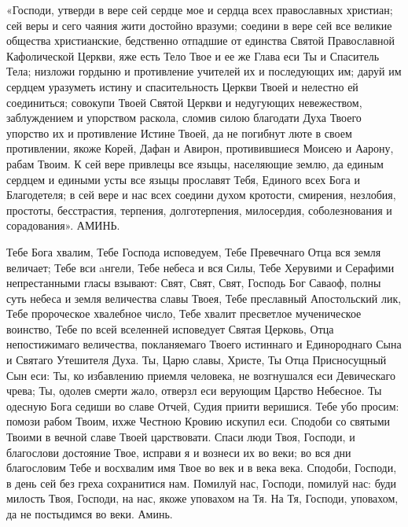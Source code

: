 \mychapterending


\begin{mymulticols}




«Господи, утверди в вере сей сердце мое и сердца всех православных христиан; сей веры и сего чаяния жити достойно вразуми; соедини в вере сей все великие общества христианские, бедственно отпадшие от единства Святой Православной Кафолической Церкви, яже есть Тело Твое и ее же Глава еси Ты и Спаситель Тела; низложи гордыню и противление учителей их и последующих им; даруй им сердцем уразуметь истину и спасительность Церкви Твоей и нелестно ей соединиться; совокупи Твоей Святой Церкви и недугующих невежеством, заблуждением и упорством раскола, сломив силою благодати Духа Твоего упорство их и противление Истине Твоей, да не погибнут люте в своем противлении, якоже Корей, Дафан и Авирон, противившиеся Моисею и Аарону, рабам Твоим. К сей вере привлецы все языцы, населяющие землю, да единым сердцем и едиными усты все языцы прославят Тебя, Единого всех Бога и Благодетеля; в сей вере и нас всех соедини духом кротости, смирения, незлобия, простоты, бесстрастия, терпения, долготерпения, милосердия, соболезнования и сорадования». АМИНЬ.




\end{mymulticols}

\mychapterending


\begin{mymulticols}




Тебе Бога хвалим, Тебе Господа исповедуем, Тебе Превечнаго Отца вся земля величает; Тебе вси aнгели, Тебе небеса и вся Силы, Тебе Херувими и Серафими непрестанными гласы взывают: Свят, Свят, Свят, Господь Бог Саваоф, полны суть небеса и земля величества славы Твоея, Тебе преславный Апостольский лик, Тебе пророческое хвалебное число, Тебе хвалит пресветлое мученическое воинство, Тебе по всей вселенней исповедует Святая Церковь, Отца непостижимаго величества, покланяемаго Твоего истиннаго и Единороднаго Сына и Святаго Утешителя Духа. Ты, Царю славы, Христе, Ты Отца Присносущный Сын еси: Ты, ко избавлению приемля человека, не возгнушался еси Девическаго чрева; Ты, одолев смерти жало, отверзл еси верующим Царство Небесное. Ты одесную Бога седиши во славе Отчей, Судия приити веришися. Тебе убо просим: помози рабом Твоим, ихже Честною Кровию искупил еси. Сподоби со святыми Твоими в вечной славе Твоей царствовати. Спаси люди Твоя, Господи, и благослови достояние Твое, исправи я и вознеси их во веки; во вся дни благословим Тебе и восхвалим имя Твое во век и в века века. Сподоби, Господи, в день сей без греха сохранитися нам. Помилуй нас, Господи, помилуй нас: буди милость Твоя, Господи, на нас, якоже уповахом на Тя. На Тя, Господи, уповахом, да не постыдимся во веки. Аминь.




\end{mymulticols}

